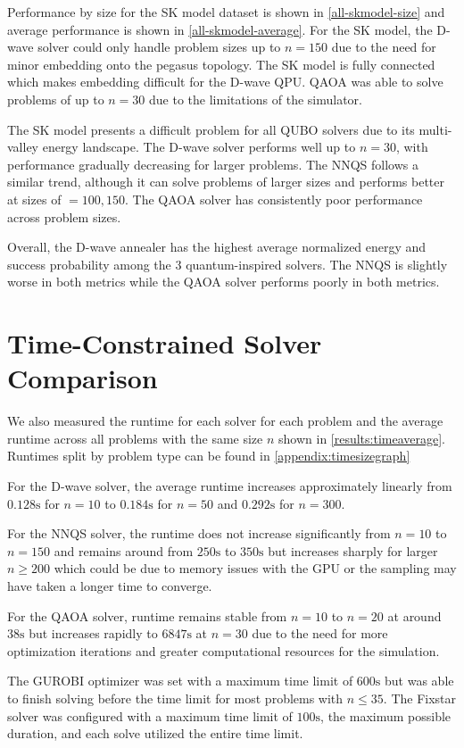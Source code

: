 Performance by size for the SK model dataset is shown in \autoref{all-skmodel-size} and average performance is shown in \autoref{all-skmodel-average}. For the SK model, the D-wave solver could only handle problem sizes up to $n=150$ due to the need for minor embedding onto the pegasus topology. The SK model is fully connected which makes embedding difficult for the D-wave QPU. QAOA was able to solve problems of up to $n=30$ due to the limitations of the simulator.

The SK model presents a difficult problem for all QUBO solvers due to its multi-valley energy landscape. The D-wave solver performs well up to $n=30$, with performance gradually decreasing for larger problems. The NNQS follows a similar trend, although it can solve problems of larger sizes and performs better at sizes of $=100,150$. The QAOA solver has consistently poor performance across problem sizes.

Overall, the D-wave annealer has the highest average normalized energy and success probability among the 3 quantum-inspired solvers. The NNQS is slightly worse in both metrics while the QAOA solver performs poorly in both metrics.

\section{Time-Constrained Solver Comparison}
We also measured the runtime for each solver for each problem and the average runtime across all problems with the same size $n$ shown in \autoref{results:timeaverage}. Runtimes split by problem type can be found in \autoref{appendix:timesizegraph}

For the D-wave solver, the average runtime increases approximately linearly from $0.128\si{\second}$ for $n=10$ to $0.184\si{\second}$ for $n=50$ and $0.292\si{\second}$ for $n=300$. 

For the NNQS solver, the runtime does not increase significantly from $n=10$ to $n=150$ and remains around from $250\si{\second}$ to $350\si{\second}$ but increases sharply for larger $n \geq 200$ which could be due to memory issues with the GPU or the sampling may have taken a longer time to converge. 

For the QAOA solver, runtime remains stable from $n=10$ to $n=20$ at around $38 \si{\second}$ but increases rapidly to $6847 \si{\second}$ at $n=30$ due to the need for more optimization iterations and greater computational resources for the simulation.

The GUROBI optimizer was set with a maximum time limit of $600 \si{\second}$ but was able to finish solving before the time limit for most problems with $n \leq 35$. The Fixstar solver was configured with a maximum time limit of $100 \si{\second}$, the maximum possible duration, and each solve utilized the entire time limit.

